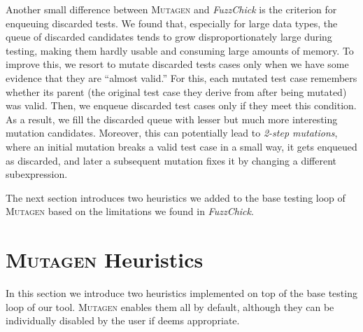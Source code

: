 \documentclass[sigconf, anonymous]{acmart}
\newcommand{\fuzzchick}{\textit{FuzzChick}\xspace}
\newcommand{\mutagen}{\textsc{Mutagen}\xspace}
\begin{document}
\begin{algorithm}
  \SetInd{0em}{0.75em}
  \SetAlgoLined
  \DontPrintSemicolon
\caption{\label{algo:mutagen:pick}\mutagen Seed Selection}
\end{algorithm}

Another small difference between \mutagen and \fuzzchick is the criterion for
enqueuing discarded tests.
%
We found that, especially for large data types, the queue of discarded
candidates tends to grow disproportionately large during testing, making them
hardly usable and consuming large amounts of memory.
%
To improve this, we resort to mutate discarded tests cases only when we have
some evidence that they are ``almost valid.''
%
For this, each mutated test case remembers whether its parent (the original test
case they derive from after being mutated) was valid.
%
Then, we enqueue discarded test cases only if they meet this condition.
%
As a result, we fill the discarded queue with lesser but much more interesting
mutation candidates.
%
Moreover, this can potentially lead to \emph{2-step mutations}, where an initial
mutation breaks a valid test case in a small way, it gets enqueued as discarded,
and later a subsequent mutation fixes it by changing a different subexpression.


The next section introduces two heuristics we added to the base testing loop of
\mutagen based on the limitations we found in \fuzzchick.
%


\section{\mutagen Heuristics}
\label{sec:heuristics}

In this section we introduce two heuristics implemented on top of the base
testing loop of our tool.
%
\mutagen enables them all by default, although they can be individually disabled
by the user if deems appropriate.
\end{document}
